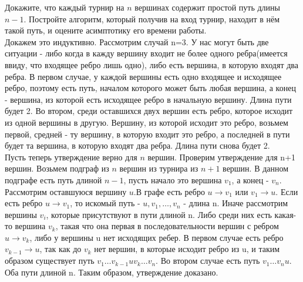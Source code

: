 \documentclass[12pt]{extreport}
\theoremstyle{definiton}
\theoremstyle{definition}
\theoremstyle{definition}
\def\prend{
	\bigskip
}
\begin{document}
	

	\Pr[3] Докажите, что каждый турнир на $n$ вершинах содержит простой путь длины $n-1$. Постройте алгоритм, который получив на вход турнир, находит в нём такой путь, и оцените асимптотику его времени работы.
	\newline
	\\Докажем это индуктивно. Рассмотрим случай n=3. У нас могут быть две ситуации - либо когда в кажду вершину входит не более одного ребра(имеется ввиду, что входящее ребро лишь одно), либо есть вершина, в которую входят два ребра. В первом случае, у каждой вершины есть одно входящее и исходящее ребро, поэтому есть путь, началом которого может быть любая вершина, а конец -  вершина, из которой есть исходящее ребро в начальную вершину. Длина пути будет 2. Во втором, среди оставшихся двух вершин есть ребро, которое исходит из одной вершины в другую. Вершину, из которой исходит это ребро, возьмем первой, средней - ту вершину, в которую входит это ребро, а последней в пути будет та вершина, в которую входят два ребра. Длина пути снова будет 2.
	\\ Пусть теперь утверждение верно для $n$ вершин. Проверим утверждение для n+1 вершин. Возьмем подграф из $n$ вершин из турнира из $n+1$ вершин. В данном подграфе есть путь длиной $n-1$, пусть начало это вершина $v_1$, а конец - $v_n$. Рассмотрим оставшуюся вершину $u$.В графе есть ребро $u \to v_1$ или $v_1 \to u$. Если есть ребро $u \to v_1$, то искомый путь  - $u,v_1,\ldots,v_n$ - длина n. Иначе рассмотрим вершины $v_i$, которые присутствуют в пути длиной n. Либо среди них есть какая-то вершина $v_k$, такая что она первая в последовательности вершин с ребром $u \to v_k$, либо у вершины u нет исходящих ребер. В первом случае есть ребро $v_{k-1} \to u$, так как до $v_k$ нет вершин, в которые исходит ребро из u, и таким образом существует путь $v_1\ldots v_{k-1}uv_k\ldots v_n$. Во втором случае есть путь $v_1 \ldots v_nu$. Оба пути длиной n. Таким образом, утверждение доказано.

	\prend
\end{document}
